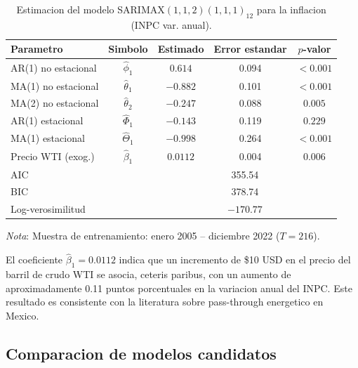 \documentclass[12pt,a4paper]{article}
\begin{document}
\begin{table}[H]
  \centering
  \caption{Estimacion del modelo SARIMAX$(1,1,2)(1,1,1)_{12}$ para la inflacion (INPC var. anual).}
  \label{tab:resultados2}
  \begin{tabular}{lcccc}
    \toprule
    \textbf{Parametro} & \textbf{Simbolo} & \textbf{Estimado} & \textbf{Error estandar} & \textbf{$p$-valor} \\
    \midrule
    AR(1) no estacional    & $\hat{\phi}_1$   &  $0.614$  & 0.094 & $<0.001$ \\
    MA(1) no estacional    & $\hat{\theta}_1$ & $-0.882$  & 0.101 & $<0.001$ \\
    MA(2) no estacional    & $\hat{\theta}_2$ & $-0.247$  & 0.088 &  $0.005$ \\
    AR(1) estacional       & $\hat{\Phi}_1$   & $-0.143$  & 0.119 &  $0.229$ \\
    MA(1) estacional       & $\hat{\Theta}_1$ & $-0.998$  & 0.264 & $<0.001$ \\
    Precio WTI (exog.)     & $\hat{\beta}_1$  &  $0.0112$ & 0.004 &  $0.006$ \\
    \midrule
    AIC               & & \multicolumn{3}{c}{355.54} \\
    BIC               & & \multicolumn{3}{c}{378.74} \\
    Log-verosimilitud & & \multicolumn{3}{c}{$-170.77$} \\
    \bottomrule
  \end{tabular}
  \begin{tablenotes}
    \small\item \textit{Nota}: Muestra de entrenamiento: enero 2005 -- diciembre 2022 ($T=216$).
  \end{tablenotes}
\end{table}

El coeficiente $\hat{\beta}_1 = 0.0112$ indica que un incremento de \$10 USD en el precio del barril de crudo WTI se asocia, ceteris paribus, con un aumento de aproximadamente 0.11 puntos porcentuales en la variacion anual del INPC. Este resultado es consistente con la literatura sobre pass-through energetico en Mexico.

\subsection{Comparacion de modelos candidatos}
\end{document}
